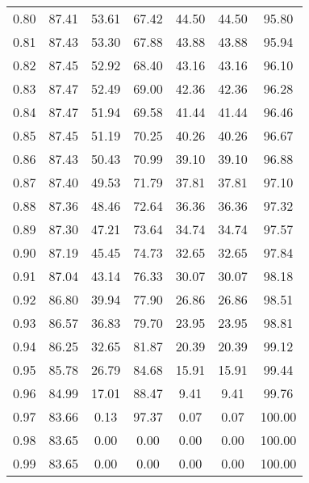 \begin{tabular}{|c|c|c|c|c|c|c|}
      0.80 &     87.41 &     53.61 &      67.42 &   44.50 &      44.50 &         95.80 \\
      0.81 &     87.43 &     53.30 &      67.88 &   43.88 &      43.88 &         95.94 \\
      0.82 &     87.45 &     52.92 &      68.40 &   43.16 &      43.16 &         96.10 \\
      0.83 &     87.47 &     52.49 &      69.00 &   42.36 &      42.36 &         96.28 \\
      0.84 &     87.47 &     51.94 &      69.58 &   41.44 &      41.44 &         96.46 \\
      0.85 &     87.45 &     51.19 &      70.25 &   40.26 &      40.26 &         96.67 \\
      0.86 &     87.43 &     50.43 &      70.99 &   39.10 &      39.10 &         96.88 \\
      0.87 &     87.40 &     49.53 &      71.79 &   37.81 &      37.81 &         97.10 \\
      0.88 &     87.36 &     48.46 &      72.64 &   36.36 &      36.36 &         97.32 \\
      0.89 &     87.30 &     47.21 &      73.64 &   34.74 &      34.74 &         97.57 \\
      0.90 &     87.19 &     45.45 &      74.73 &   32.65 &      32.65 &         97.84 \\
      0.91 &     87.04 &     43.14 &      76.33 &   30.07 &      30.07 &         98.18 \\
      0.92 &     86.80 &     39.94 &      77.90 &   26.86 &      26.86 &         98.51 \\
      0.93 &     86.57 &     36.83 &      79.70 &   23.95 &      23.95 &         98.81 \\
      0.94 &     86.25 &     32.65 &      81.87 &   20.39 &      20.39 &         99.12 \\
      0.95 &     85.78 &     26.79 &      84.68 &   15.91 &      15.91 &         99.44 \\
      0.96 &     84.99 &     17.01 &      88.47 &    9.41 &       9.41 &         99.76 \\
      0.97 &     83.66 &      0.13 &      97.37 &    0.07 &       0.07 &        100.00 \\
      0.98 &     83.65 &      0.00 &       0.00 &    0.00 &       0.00 &        100.00 \\
      0.99 &     83.65 &      0.00 &       0.00 &    0.00 &       0.00 &        100.00 \\
\bottomrule
\end{tabular}
